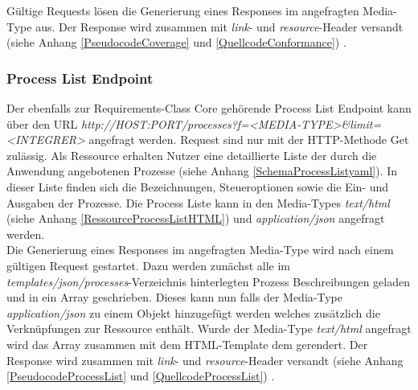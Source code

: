 Gültige Requests lösen die Generierung eines Responses im angefragten Media-Type aus. 
Der Response wird zusammen mit \textit{link}- und \textit{resource}-Header versandt (siehe Anhang \ref{PseudocodeCoverage} und \ref{QuellcodeConformance})
\cite{ogc_api_processes_core}.

\subsubsection{Process List Endpoint}
Der ebenfalls zur Requirements-Class Core gehörende Process List Endpoint kann über den URL \textit{http://HOST:PORT/processes?f=<MEDIA-TYPE>\&limit=<INTEGRER>} 
angefragt werden. Request sind nur mit der HTTP-Methode Get zulässig. Als Ressource erhalten Nutzer eine detaillierte Liste der durch die Anwendung angebotenen 
Prozesse (siehe Anhang \ref{SchemaProcessListyaml}). In dieser Liste finden sich die Bezeichnungen, 
Steueroptionen sowie die Ein- und Ausgaben der Prozesse. Die Process Liste kann in den Media-Types \textit{text/html} (siehe Anhang \ref{RessourceProcessListHTML}) 
und \textit{application/json} angefragt werden. \\

Die Generierung eines Responses im angefragten Media-Type wird nach einem gültigen Request gestartet. 
Dazu werden zunächst alle im \textit{templates/json/processes}-Verzeichnis hinterlegten Prozess Beschreibungen geladen und in ein Array geschrieben. 
Dieses kann nun falls der Media-Type \textit{application/json} zu einem Objekt hinzugefügt werden welches zusätzlich die Verknüpfungen zur Ressource enthält. 
Wurde der Media-Type \textit{text/html} angefragt wird das Array zusammen mit dem HTML-Template dem gerendert. 
Der Response wird zusammen mit \textit{link}- und \textit{resource}-Header versandt (siehe Anhang \ref{PseudocodeProcessList} und \ref{QuellcodeProcessList}) 
\cite{ogc_api_processes_core}.

